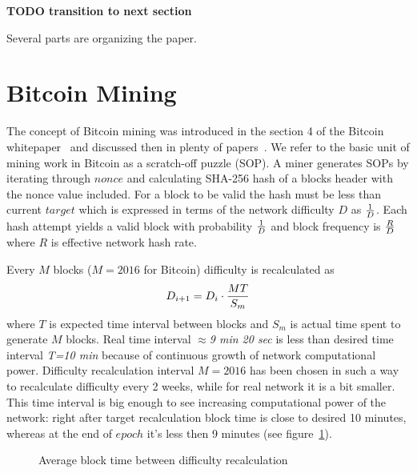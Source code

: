 \documentclass[number,preprint,review]{elsarticle}
\begin{document}
\textbf{TODO transition to next section}

Several parts are organizing the paper. 

\section{Bitcoin Mining}
\label{sec:bit}

The concept of Bitcoin mining was introduced in the section 4 of the Bitcoin whitepaper~\cite{Nakamoto2008} and discussed then in plenty of papers~\cite{kraft2015difficulty, miller2014permacoin, eyal2014majority}.
We refer to the basic unit of mining work in Bitcoin as a scratch-off puzzle (SOP).
A miner generates SOPs by iterating through \(nonce\) and calculating SHA-256 hash of a blocks header with the nonce value included.
For a block to be valid the hash must be less than current \(target\) which is expressed in terms of the network difficulty \(D\) as \(1\over D\).
Each hash attempt yields a valid block with probability \(1\over D\) and block frequency is \(R\over D\) where \(R\) is effective network hash rate.

Every \(M\) blocks (\(M=2016\) for Bitcoin) difficulty is recalculated as
\begin{equation}
D_{i+1}=D_i \cdot {MT\over S_m}
\end{equation}
where \(T\) is expected time interval between blocks and \(S_m\) is actual time spent to generate \(M\) blocks.
Real time interval $\approx$\textit{9 min 20 sec} is less than desired time interval \textit{T=10 min} because of continuous growth of network computational power.
Difficulty recalculation interval \(M=2016\) has been chosen in such a way to recalculate difficulty every 2 weeks, while for real network it is a bit smaller.
This time interval is big enough to see increasing computational power of the network: right after target recalculation block time is close to desired 10 minutes, whereas at the end of \(epoch\) it's less then 9 minutes (see figure~\ref{fig:image}).

\begin{figure}[H]
\caption{Average block time between difficulty recalculation}
\label{fig:image}
\end{figure}
\end{document}
